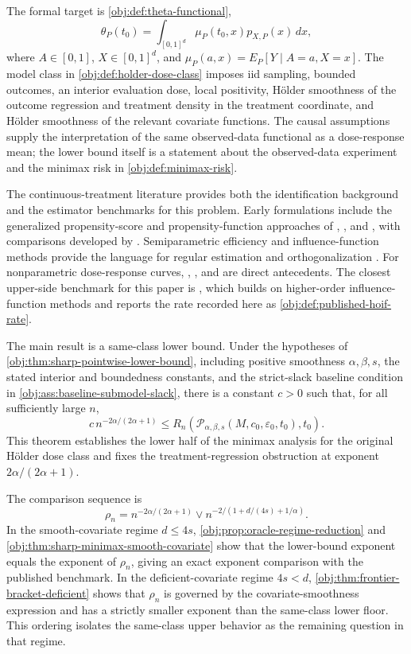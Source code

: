 \documentclass[11pt]{article}
\begin{document}
The formal target is \cref{obj:def:theta-functional},
\[
\theta_P(t_0)=\int_{[0,1]^d}\mu_P(t_0,x)p_{X,P}(x)\,dx,
\]
where \(A\in[0,1]\), \(X\in[0,1]^d\), and \(\mu_P(a,x)=E_P[Y\mid A=a,X=x]\). The model class in \cref{obj:def:holder-dose-class} imposes iid sampling, bounded outcomes, an interior evaluation dose, local positivity, Hölder smoothness of the outcome regression and treatment density in the treatment coordinate, and Hölder smoothness of the relevant covariate functions. The causal assumptions supply the interpretation of the same observed-data functional as a dose-response mean; the lower bound itself is a statement about the observed-data experiment and the minimax risk in \cref{obj:def:minimax-risk}.

The continuous-treatment literature provides both the identification background and the estimator benchmarks for this problem. Early formulations include the generalized propensity-score and propensity-function approaches of \citet{imbens2000}, \citet{hirano2004}, and \citet{imai2004}, with comparisons developed by \citet{zhao2013}. Semiparametric efficiency and influence-function methods provide the language for regular estimation and orthogonalization \citep{bickel1993,vanderVaart1998,vanderLaan2003,chernozhukov2018}. For nonparametric dose-response curves, \citet{kennedy2017}, \citet{lee2018}, and \citet{colangelo2020} are direct antecedents. The closest upper-side benchmark for this paper is \citet{bonvini2022}, which builds on higher-order influence-function methods \citep{robins2008,robins2015} and reports the rate recorded here as \cref{obj:def:published-hoif-rate}.

The main result is a same-class lower bound. Under the hypotheses of \cref{obj:thm:sharp-pointwise-lower-bound}, including positive smoothness \(\alpha,\beta,s\), the stated interior and boundedness constants, and the strict-slack baseline condition in \cref{obj:ass:baseline-submodel-slack}, there is a constant \(c>0\) such that, for all sufficiently large \(n\),
\[
c\,n^{-2\alpha/(2\alpha+1)}
\le
R_n\!\left(
\mathcal P_{\alpha,\beta,s}(M,c_0,\varepsilon_0,t_0),
t_0
\right).
\]
This theorem establishes the lower half of the minimax analysis for the original Hölder dose class and fixes the treatment-regression obstruction at exponent \(2\alpha/(2\alpha+1)\).

The comparison sequence is
\[
\rho_n=
n^{-2\alpha/(2\alpha+1)}
\vee
n^{-2/(1+d/(4s)+1/\alpha)}.
\]
In the smooth-covariate regime \(d\le 4s\), \cref{obj:prop:oracle-regime-reduction} and \cref{obj:thm:sharp-minimax-smooth-covariate} show that the lower-bound exponent equals the exponent of \(\rho_n\), giving an exact exponent comparison with the published benchmark. In the deficient-covariate regime \(4s<d\), \cref{obj:thm:frontier-bracket-deficient} shows that \(\rho_n\) is governed by the covariate-smoothness expression and has a strictly smaller exponent than the same-class lower floor. This ordering isolates the same-class upper behavior as the remaining question in that regime.
\end{document}
